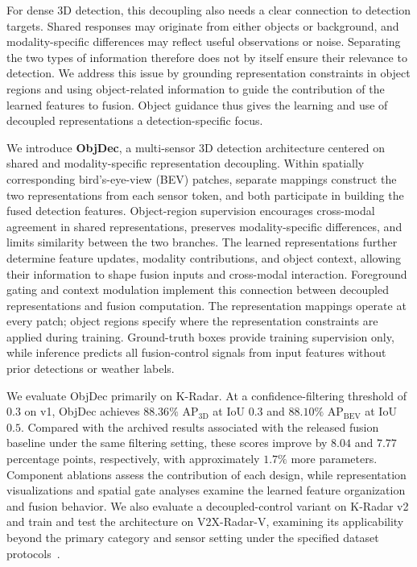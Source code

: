 For dense 3D detection, this decoupling also needs a clear connection to detection targets.
Shared responses may originate from either objects or background, and modality-specific differences may reflect useful observations or noise.
Separating the two types of information therefore does not by itself ensure their relevance to detection.
We address this issue by grounding representation constraints in object regions and using object-related information to guide the contribution of the learned features to fusion.
Object guidance thus gives the learning and use of decoupled representations a detection-specific focus.

We introduce \textbf{ObjDec}, a multi-sensor 3D detection architecture centered on shared and modality-specific representation decoupling.
Within spatially corresponding bird's-eye-view (BEV) patches, separate mappings construct the two representations from each sensor token, and both participate in building the fused detection features.
Object-region supervision encourages cross-modal agreement in shared representations, preserves modality-specific differences, and limits similarity between the two branches.
The learned representations further determine feature updates, modality contributions, and object context, allowing their information to shape fusion inputs and cross-modal interaction.
Foreground gating and context modulation implement this connection between decoupled representations and fusion computation.
The representation mappings operate at every patch; object regions specify where the representation constraints are applied during training.
Ground-truth boxes provide training supervision only, while inference predicts all fusion-control signals from input features without prior detections or weather labels.

We evaluate ObjDec primarily on K-Radar.
At a confidence-filtering threshold of $0.3$ on v1, ObjDec achieves $88.36\%$ $\mathrm{AP}_{\mathrm{3D}}$ at IoU $0.3$ and $88.10\%$ $\mathrm{AP}_{\mathrm{BEV}}$ at IoU $0.5$.
Compared with the archived results associated with the released fusion baseline under the same filtering setting, these scores improve by $8.04$ and $7.77$ percentage points, respectively, with approximately $1.7\%$ more parameters.
Component ablations assess the contribution of each design, while representation visualizations and spatial gate analyses examine the learned feature organization and fusion behavior.
We also evaluate a decoupled-control variant on K-Radar v2 and train and test the architecture on V2X-Radar-V, examining its applicability beyond the primary category and sensor setting under the specified dataset protocols~\citep{paek2022kradar,paek2025asf,yang2025v2xradar}.

